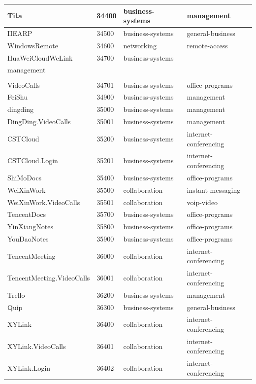 \begin{longtable}{p{}|p{}|p{}|p{}}
    Tita &	34400 &	business-systems &	management \\ \hline
    IIEARP &	34500 &	business-systems &	general-business \\ \hline
    WindowsRemote &	34600 &	networking &	remote-access \\ \hline
    HuaWeiCloudWeLink &	34700 &	business-systems &	\tabincell{l}{voip-video\\ management} \\ \hline
    \tabincell{l}{HuaWeiCloudWeLink.\\VideoCalls} &	34701 &	business-systems &	office-programs \\ \hline
    FeiShu &	34900 &	business-systems &	management \\ \hline
    dingding &	35000 &	business-systems &	management \\ \hline
    DingDing.VideoCalls &	35001 &	business-systems &	management \\ \hline
    CSTCloud &	35200 &	business-systems &	internet-conferencing \\ \hline
    CSTCloud.Login &	35201 &	business-systems &	internet-conferencing \\ \hline
    ShiMoDocs &	35400 &	business-systems &	office-programs \\ \hline
    WeiXinWork &	35500 &	collaboration &	instant-messaging \\ \hline
    WeiXinWork.VideoCalls &	35501 &	collaboration &	voip-video \\ \hline
    TencentDocs &	35700 &	business-systems &	office-programs \\ \hline
    YinXiangNotes &	35800 &	business-systems &	office-programs \\ \hline
    YouDaoNotes &	35900 &	business-systems &	office-programs \\ \hline
    TencentMeeting &	36000 &	collaboration &	internet-conferencing \\ \hline
    TencentMeeting.VideoCalls &	36001 &	collaboration &	internet-conferencing \\ \hline
    Trello &	36200 &	business-systems &	management \\ \hline
    Quip &	36300 &	business-systems &	general-business \\ \hline
    XYLink &	36400 &	collaboration &	internet-conferencing \\ \hline
    XYLink.VideoCalls &	36401 &	collaboration &	internet-conferencing \\ \hline
    XYLink.Login &	36402 &	collaboration &	internet-conferencing \\ \hline

\end{longtable}

